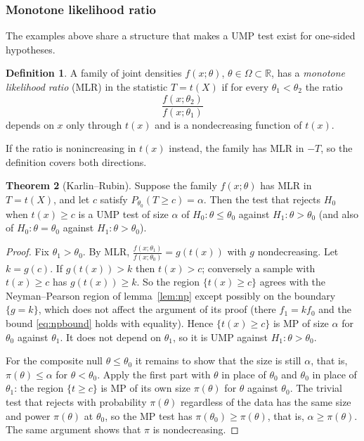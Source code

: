 \documentclass[12pt,a4paper]{report}
\theoremstyle{definition}
\newtheorem{thm}{Theorem}[section]
\newtheorem{definition}[thm]{Definition}
\theoremstyle{plain}
\begin{document}
\subsubsection{Monotone likelihood ratio}

The examples above share a structure that makes a UMP test exist for one-sided
hypotheses.

\begin{definition}
\label{def:mlr}
A family of joint densities $f(x;\theta)$, $\theta\in\Omega\subset\mathbb{R}$, has
a \emph{monotone likelihood ratio} (MLR) in the statistic $T = t(X)$ if for every
$\theta_1<\theta_2$ the ratio
\[\frac{f(x;\theta_2)}{f(x;\theta_1)}\]
depends on $x$ only through $t(x)$ and is a nondecreasing function of $t(x)$.
\end{definition}

If the ratio is nonincreasing in $t(x)$ instead, the family has MLR in $-T$, so the
definition covers both directions.

\begin{thm}[Karlin--Rubin]
\label{thm:karlinrubin}
Suppose the family $f(x;\theta)$ has MLR in $T = t(X)$, and let $c$ satisfy
$P_{\theta_0}(T\ge c) = \alpha$. Then the test that rejects $H_0$ when $t(x)\ge c$
is a UMP test of size $\alpha$ of $H_0\colon\theta\le\theta_0$ against
$H_1\colon\theta>\theta_0$ (and also of $H_0\colon\theta = \theta_0$ against
$H_1\colon\theta>\theta_0$).
\end{thm}

\begin{proof}
Fix $\theta_1>\theta_0$. By MLR,
$\frac{f(x;\theta_1)}{f(x;\theta_0)} = g(t(x))$ with $g$ nondecreasing. Let
$k = g(c)$. If $g(t(x))>k$ then $t(x)>c$; conversely a sample with $t(x)\ge c$ has
$g(t(x))\ge k$. So the region $\{t(x)\ge c\}$ agrees with the Neyman--Pearson region
of lemma~\ref{lem:np} except possibly on the boundary $\{g = k\}$, which does not
affect the argument of its proof (there $f_1 = k f_0$ and the bound
\eqref{eq:npbound} holds with equality). Hence $\{t(x)\ge c\}$ is MP of size
$\alpha$ for $\theta_0$ against $\theta_1$. It does not depend on $\theta_1$, so it
is UMP against $H_1\colon\theta>\theta_0$.

For the composite null $\theta\le\theta_0$ it remains to show that the size is
still $\alpha$, that is, $\pi(\theta)\le\alpha$ for $\theta<\theta_0$. Apply the
first part with $\theta$ in place of $\theta_0$ and $\theta_0$ in place of
$\theta_1$: the region $\{t\ge c\}$ is MP of its own size $\pi(\theta)$ for $\theta$
against $\theta_0$. The trivial test that rejects with probability $\pi(\theta)$
regardless of the data has the same size and power $\pi(\theta)$ at $\theta_0$, so
the MP test has $\pi(\theta_0)\ge\pi(\theta)$, that is, $\alpha\ge\pi(\theta)$. The
same argument shows that $\pi$ is nondecreasing.
\end{proof}
\end{document}
